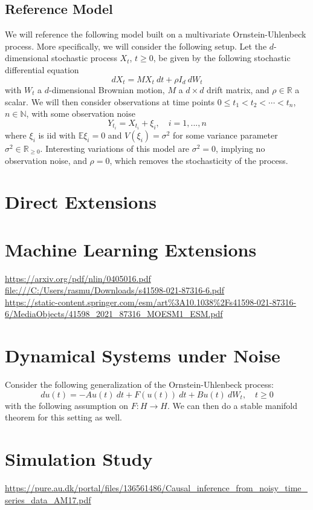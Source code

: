 \documentclass[11pt, a4paper]{memoir}
\theoremstyle{break}
\theoremstyle{break}
\theoremstyle{nonumberplain}
\begin{document}
\subsection*{Reference Model}
We will reference the following model built on a multivariate Ornstein-Uhlenbeck process. More specifically, we will consider the following setup. Let the $d$-dimensional stochastic process $X_t$, $t\geqslant 0$, be given by the following stochastic differential equation
$$dX_t=M X_t\ dt+\rho I_d\ dW_t$$
with $W_t$ a $d$-dimensional  Brownian motion, $M$ a $d\times d$ drift matrix, and $\rho\in \mathbb{R}$ a scalar. We will then consider observations at time points $0\leqslant t_1<t_2<\cdots <t_n$, $n\in \mathbb{N}$, with some observation noise
$$Y_{t_i}=X_{t_i}+\xi_i,\quad i=1,...,n$$
where $\xi_i$ is iid with $\mathbb{E} \xi_i=0$ and $V(\xi_i)=\sigma^2$ for some variance parameter $\sigma^2\in \mathbb{R}_{\geqslant 0}$. Interesting variations of this model are $\sigma^2=0$, implying no observation noise, and $\rho=0$, which removes the stochasticity of the process.
\section{Direct Extensions}


\section{Machine Learning Extensions}
\url{https://arxiv.org/pdf/nlin/0405016.pdf}\\[5pt]
\url{file:///C:/Users/rasmu/Downloads/s41598-021-87316-6.pdf}\\[5pt]
\url{https://static-content.springer.com/esm/art%3A10.1038%2Fs41598-021-87316-6/MediaObjects/41598_2021_87316_MOESM1_ESM.pdf}

\section{Dynamical Systems under Noise}
Consider the following generalization of the Ornstein-Uhlenbeck process:
$$du(t)=-Au(t)\ dt+F(u(t))\ dt+B u(t)\ dW_t,\quad t\geqslant 0$$
with the following assumption on $F:H\to H$. We can then do a stable manifold theorem for this setting as well.
\cite{StableManifoldStoc} 


\section{Simulation Study}
\url{https://pure.au.dk/portal/files/136561486/Causal_inference_from_noisy_time_series_data_AM17.pdf}






\end{document}
